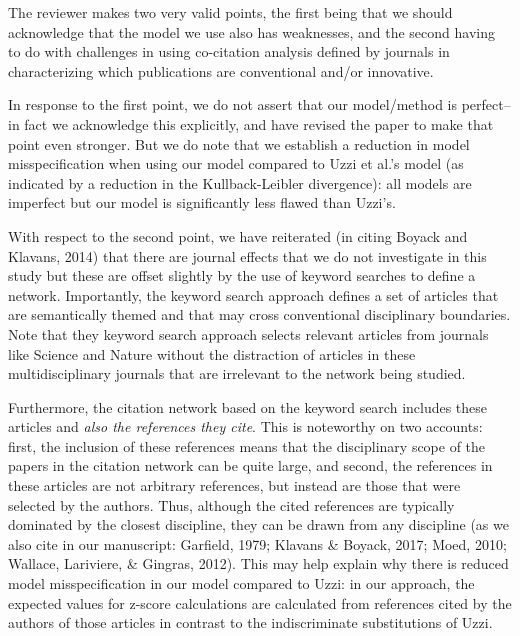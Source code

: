 \documentclass[11pt, oneside]{article}   	%
\begin{document}
The reviewer makes two very valid points, the first being that we should acknowledge that the model we use also has weaknesses, and the second having to do with challenges in using co-citation analysis defined by journals in characterizing which publications are conventional and/or innovative. 

In response to the first point, we do not assert that our model/method is perfect--in fact we acknowledge this explicitly, and have revised the paper to make that point even stronger. But we do note that we establish a reduction in model misspecification when using our model compared to Uzzi et al.'s model (as indicated by a reduction in the Kullback-Leibler divergence): all models are imperfect but our model is significantly less flawed than Uzzi's. 

With respect to the second point, we have reiterated (in citing Boyack and Klavans, 2014) that there are journal effects that we do not investigate in this study but these are offset slightly by the use of keyword searches to define a network.
Importantly, the keyword search approach  defines a set of articles that are semantically themed and that may cross conventional disciplinary boundaries. Note that they keyword search approach selects relevant articles from journals like Science and Nature without the distraction of articles in these multidisciplinary journals that are irrelevant to the network being studied.

Furthermore, the citation network based on the keyword search includes these articles and {\em also the references they cite}. This is noteworthy on two accounts: first, the inclusion of these references means that the disciplinary scope of the papers in the citation network can be quite large, and second, the references in these articles are not arbitrary references, but instead are those that were selected by the authors. Thus, although the cited references are typically dominated by the closest discipline, they can be drawn from any discipline (as we also cite in our manuscript: Garfield, 1979; Klavans \& Boyack, 2017; Moed, 2010; Wallace, Lariviere, \& Gingras, 2012). This may help explain why there is reduced model misspecification  in our model compared to Uzzi: in our approach, the expected values for z-score calculations are calculated from references cited by the authors of those articles in contrast to the indiscriminate substitutions of Uzzi. 
\end{document}
